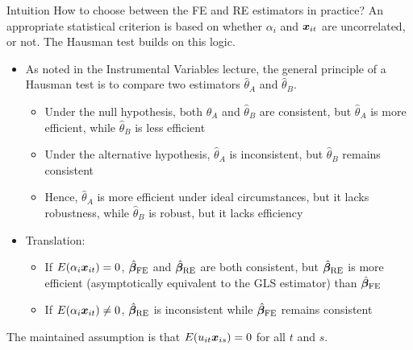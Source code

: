 \documentclass[english, professionalfonts,smaller,xcolor=dvipsnames]{beamer}
\begin{document}
\begin{frame}{Intuition}
How to choose between the FE and RE estimators in practice? An appropriate statistical criterion is based on whether $\alpha_i$ and $\bm x_{it}$ are uncorrelated, or not. The Hausman test builds on this logic.

\begin{itemize}
\item As noted in the Instrumental Variables lecture, the general principle of a Hausman test is to compare two estimators $\hat\theta_A$ and $\hat\theta_B$.
\begin{itemize}
\item Under the null hypothesis, both $\hat\theta_A$ and $\hat\theta_B$ are consistent, but $\hat\theta_A$ is more efficient, while $\hat\theta_B$ is less efficient
\item Under the alternative hypothesis, $\hat\theta_A$ is inconsistent, but $\hat\theta_B$ remains consistent
\item Hence, $\hat\theta_A$ is more efficient under ideal circumstances, but it lacks robustness, while $\hat\theta_B$ is robust, but it lacks efficiency
\end{itemize}
\item Translation:
\begin{itemize}
\item If $E(\alpha_i \bm x_{it})=0$, $\hat{\bm \beta}_{\text{FE}}$ and $\hat{\bm \beta}_{\text{RE}}$ are both consistent, but $\hat{\bm \beta}_{\text{RE}}$ is more efficient (asymptotically equivalent to the GLS estimator) than $\hat{\bm \beta}_{\text{FE}}$
\item If $E(\alpha_i \bm x_{it}) \neq0$, $\hat{\bm \beta}_{\text{RE}}$ is inconsistent while $\hat{\bm \beta}_{\text{FE}}$ remains consistent
\end{itemize}
\end{itemize}
The maintained assumption is that $E(u_{it} \bm x_{is}) =0$ for all $t$ and $s$.
\end{frame}
\end{document}
